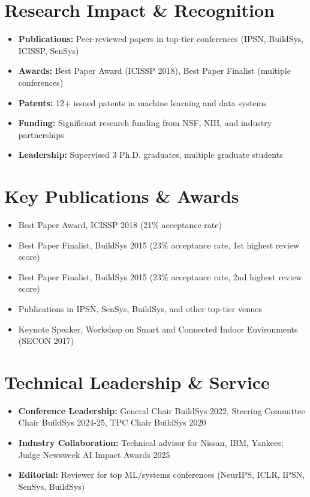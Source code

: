\documentclass[11pt]{article}
\begin{document}
\section{Research Impact \& Recognition}
\begin{itemize}
    \item \textbf{Publications:} Peer-reviewed papers in top-tier conferences (IPSN, BuildSys, ICISSP, SenSys)
    \item \textbf{Awards:} Best Paper Award (ICISSP 2018), Best Paper Finalist (multiple conferences)
    \item \textbf{Patents:} 12+ issued patents in machine learning and data systems
    \item \textbf{Funding:} Significant research funding from NSF, NIH, and industry partnerships
    \item \textbf{Leadership:} Supervised 3 Ph.D. graduates, multiple graduate students
\end{itemize}

\section{Key Publications \& Awards}
\begin{itemize}[topsep=1pt,itemsep=2pt]
    \item Best Paper Award, ICISSP 2018 (21\% acceptance rate)
    \item Best Paper Finalist, BuildSys 2015 (23\% acceptance rate, 1st highest review score)
    \item Best Paper Finalist, BuildSys 2015 (23\% acceptance rate, 2nd highest review score)
    \item Publications in IPSN, SenSys, BuildSys, and other top-tier venues
    \item Keynote Speaker, Workshop on Smart and Connected Indoor Environments (SECON 2017)
\end{itemize}

\section{Technical Leadership \& Service}
\begin{itemize}
    \item \textbf{Conference Leadership:} General Chair BuildSys 2022, Steering Committee Chair BuildSys 2024-25, TPC Chair BuildSys 2020
    \item \textbf{Industry Collaboration:} Technical advisor for Nissan, IBM, Yankees; Judge Newsweek AI Impact Awards 2025
    \item \textbf{Editorial:} Reviewer for top ML/systems conferences (NeurIPS, ICLR, IPSN, SenSys, BuildSys)
\end{itemize}
\end{document}
